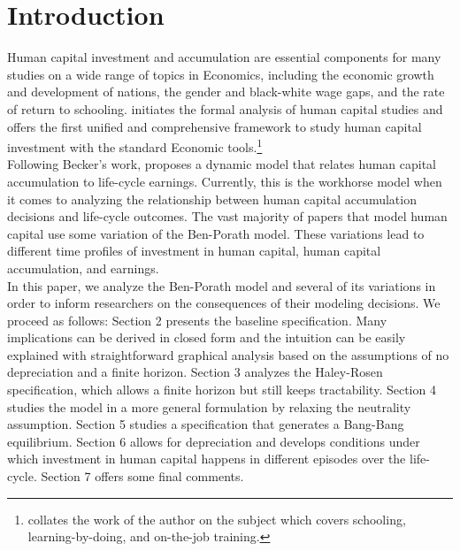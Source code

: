 \section{Introduction}
\noindent Human capital investment and accumulation are essential components for many studies on a wide range of topics in Economics, including the economic growth and development of nations, the gender and black-white wage gaps, and the rate of return to schooling. \citet{becker1962investment} initiates the formal analysis of human capital studies and offers the first unified and comprehensive framework to study human capital investment with the standard Economic tools.\footnote{\citet{becker2009human} collates the work of the author on the subject which covers schooling, learning-by-doing, and on-the-job training.} \\
\indent Following Becker's work, \citet{ben1967production} proposes a dynamic model that relates human capital accumulation to life-cycle earnings. Currently, this is the workhorse model when it comes to analyzing the relationship between human capital accumulation decisions and life-cycle outcomes. The vast majority of papers that model human capital use some variation of the Ben-Porath model. These variations lead to different time profiles of investment in human capital, human capital accumulation, and earnings.\\
\indent In this paper, we analyze the Ben-Porath model and several of its variations in order to inform researchers on the consequences of their modeling decisions. We proceed as follows: Section 2 presents the baseline specification. Many implications can be derived in closed form and the intuition can be easily explained with straightforward graphical analysis based on the assumptions of no depreciation and a finite horizon. Section 3 analyzes the Haley-Rosen specification, which allows a finite horizon but still keeps tractability. %
 Section 4 studies the model in a more general formulation by relaxing the neutrality assumption. Section 5 studies a specification that generates a Bang-Bang equilibrium. Section 6 allows for depreciation and develops conditions under which investment in human capital happens in different episodes over the life-cycle. Section 7 offers some final comments. \\